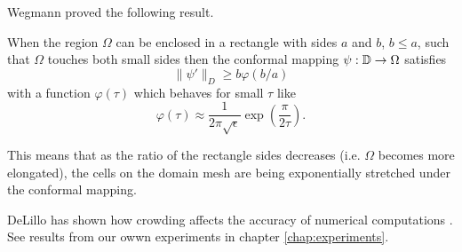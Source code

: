 Wegmann proved the following result.

\begin{theorem} 
    When the region $\Omega$ can be enclosed in a rectangle with sides $a$ and $b$, $b \leq a$, such that $\Omega$ touches both small sides then the conformal mapping $\psi : \mathbb{D} \rightarrow \Omega$ satisfies
    $$
    \|\psi'\|_D \geq b \varphi(b/a)
    $$
    with a function $\varphi(\tau)$ which behaves for small $\tau$ like
    $$
    \varphi(\tau) \approx \frac{1}{2\pi \sqrt{\epsilon}} \exp\left(\frac{\pi}{2\tau}\right).
    $$
\end{theorem}
This means that as the ratio of the rectangle sides decreases (i.e. $\Omega$ becomes more elongated), the cells on the domain mesh are being exponentially stretched under the conformal mapping.


DeLillo has shown how crowding affects the accuracy of numerical computations \cite{DeLillo1994_crowding_accuracy}. 
See results from our owwn experiments in chapter \ref{chap:experiments}. 